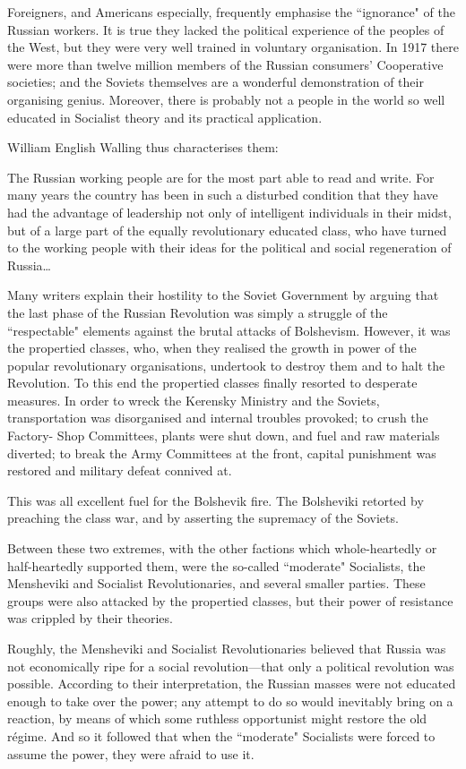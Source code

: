Foreigners, and Americans especially, frequently emphasise the ``ignorance" of the Russian workers. It is true they lacked the political experience of the peoples of the West, but they were very well trained in voluntary organisation. In 1917 there were more than twelve million members of the Russian consumers’ Cooperative societies; and the Soviets themselves are a wonderful demonstration of their organising genius. Moreover, there is probably not a people in the world so well educated in Socialist theory and its practical application.

William English Walling thus characterises them:

The Russian working people are for the most part able to read and write. For many years the country has been in such a disturbed condition that they have had the advantage of leadership not only of intelligent individuals in their midst, but of a large part of the equally revolutionary educated class, who have turned to the working people with their ideas for the political and social regeneration of Russia\ldots

Many writers explain their hostility to the Soviet Government by arguing that the last phase of the Russian Revolution was simply a struggle of the ``respectable" elements against the brutal attacks of Bolshevism. However, it was the propertied classes, who, when they realised the growth in power of the popular revolutionary organisations, undertook to destroy them and to halt the Revolution. To this end the propertied classes finally resorted to desperate measures. In order to wreck the Kerensky Ministry and the Soviets, transportation was disorganised and internal troubles provoked; to crush the Factory- Shop Committees, plants were shut down, and fuel and raw materials diverted; to break the Army Committees at the front, capital punishment was restored and military defeat connived at.

This was all excellent fuel for the Bolshevik fire. The Bolsheviki retorted by preaching the class war, and by asserting the supremacy of the Soviets.

Between these two extremes, with the other factions which whole-heartedly or half-heartedly supported them, were the so-called ``moderate" Socialists, the Mensheviki and Socialist Revolutionaries, and several smaller parties. These groups were also attacked by the propertied classes, but their power of resistance was crippled by their theories.

Roughly, the Mensheviki and Socialist Revolutionaries believed that Russia was not economically ripe for a social revolution—that only a political revolution was possible. According to their interpretation, the Russian masses were not educated enough to take over the power; any attempt to do so would inevitably bring on a reaction, by means of which some ruthless opportunist might restore the old régime. And so it followed that when the ``moderate" Socialists were forced to assume the power, they were afraid to use it.


